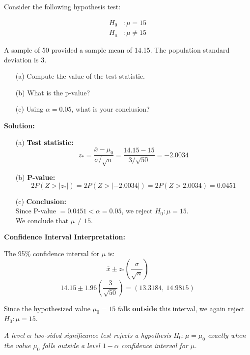 \begin{example}

Consider the following hypothesis test:

\begin{align*}
H_0 &: \mu = 15 \\ 
H_a &: \mu \ne 15
\end{align*}

A sample of 50 provided a sample mean of 14.15. The population standard deviation is 3.

\begin{enumerate}
    \item[(a)] Compute the value of the test statistic.
    \item[(b)] What is the p-value?
    \item[(c)] Using $\alpha = 0.05$, what is your conclusion?
\end{enumerate}

\textbf{Solution:}

\begin{enumerate}
    \item[(a)] \textbf{Test statistic:}
    \[
    z_\ast = \frac{\bar{x} - \mu_0}{\sigma / \sqrt{n}} = \frac{14.15 - 15}{3 / \sqrt{50}} = -2.0034
    \]

    \item[(b)] \textbf{P-value:}
    \[
    2P(Z > |z_\ast|) = 2P(Z > |{-2.0034}|) = 2P(Z > 2.0034) = 0.0451
    \]

    \item[(c)] \textbf{Conclusion:} \\
    Since P-value $= 0.0451 < \alpha = 0.05$, we reject $H_0 : \mu = 15$. \\
    We conclude that $\mu \ne 15$.
\end{enumerate}

\textbf{Confidence Interval Interpretation:}

The 95\% confidence interval for $\mu$ is:
\[
\bar{x} \pm z_\ast \left( \frac{\sigma}{\sqrt{n}} \right)
\]
\[
14.15 \pm 1.96 \left( \frac{3}{\sqrt{50}} \right)
= (13.3184,\ 14.9815)
\]

Since the hypothesized value $\mu_0 = 15$ falls \textbf{outside} this interval, we again reject $H_0 : \mu = 15$.

\end{example}
\begin{nt}
\textit{
A level $\alpha$ two-sided significance test rejects a hypothesis $H_0 : \mu = \mu_0$ exactly when the value $\mu_0$ falls outside a level $1 - \alpha$ confidence interval for $\mu$.
}

\end{nt}
